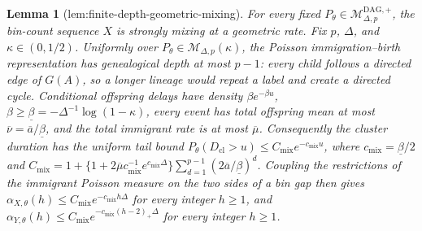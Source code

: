 \documentclass{article}
\newtheorem{lemma}{Lemma}
\begin{document}
\begin{lemma}[lem:finite-depth-geometric-mixing]\label{lem:finite-depth-geometric-mixing}
For every fixed \(P_{\theta}\in\mathcal M_{\Delta,p}^{\mathrm{DAG},+}\), the bin-count sequence \(X\) is strongly mixing at a geometric rate. Fix \(p\), \(\Delta\), and \(\kappa\in(0,1/2)\). Uniformly over \(P_{\theta}\in\mathcal M_{\Delta,p}(\kappa)\), the Poisson immigration--birth representation has genealogical depth at most \(p-1\): every child follows a directed edge of \(G(A)\), so a longer lineage would repeat a label and create a directed cycle. Conditional offspring delays have density \(\beta e^{-\beta u}\), \(\beta\geq\underline\beta=-\Delta^{-1}\log(1-\kappa)\), every event has total offspring mean at most \(\overline\nu=\overline a/\underline\beta\), and the total immigrant rate is at most \(\overline\mu\). Consequently the cluster duration has the uniform tail bound \(P_{\theta}(D_{\mathrm{cl}}>u)\leq C_{\mathrm{mix}}e^{-c_{\mathrm{mix}}u}\), where \(c_{\mathrm{mix}}=\underline\beta/2\) and \(C_{\mathrm{mix}}=1+\{1+2\overline\mu c_{\mathrm{mix}}^{-1}e^{c_{\mathrm{mix}}\Delta}\}\sum_{d=1}^{p-1}(2\overline a/\underline\beta)^d\). Coupling the restrictions of the immigrant Poisson measure on the two sides of a bin gap then gives \(\alpha_{X,\theta}(h)\leq C_{\mathrm{mix}}e^{-c_{\mathrm{mix}}h\Delta}\) for every integer \(h\geq1\), and \(\alpha_{Y,\theta}(h)\leq C_{\mathrm{mix}}e^{-c_{\mathrm{mix}}(h-2)_{+}\Delta}\) for every integer \(h\geq1\).
\end{lemma}
\end{document}
